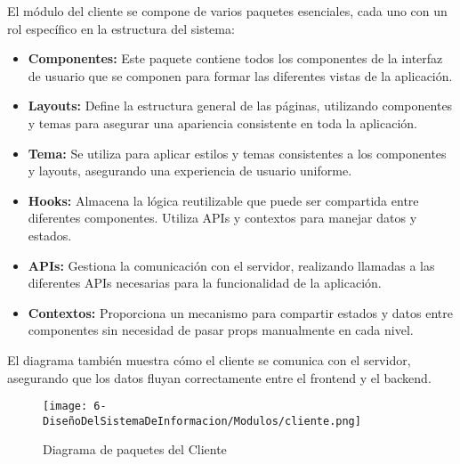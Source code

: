 El módulo del cliente se compone de varios paquetes esenciales, cada uno con un rol específico en la estructura del sistema:
\begin{itemize}
	\item \textbf{Componentes:}  Este paquete contiene todos los componentes de la interfaz de usuario que se componen para formar las diferentes vistas de la aplicación.
	\item \textbf{Layouts:} Define la estructura general de las páginas, utilizando componentes y temas para asegurar una apariencia consistente en toda la aplicación.
	\item \textbf{Tema:} Se utiliza para aplicar estilos y temas consistentes a los componentes y layouts, asegurando una experiencia de usuario uniforme.
	\item \textbf{Hooks:} Almacena la lógica reutilizable que puede ser compartida entre diferentes componentes. Utiliza APIs y contextos para manejar datos y estados.
	\item \textbf{APIs:} Gestiona la comunicación con el servidor, realizando llamadas a las diferentes APIs necesarias para la funcionalidad de la aplicación.
	\item \textbf{Contextos:} Proporciona un mecanismo para compartir estados y datos entre componentes sin necesidad de pasar props manualmente en cada nivel.
\end{itemize}
El diagrama también muestra cómo el cliente se comunica con el servidor, asegurando que los datos fluyan correctamente entre el frontend y el backend.

\begin{figure}[H]
	\centering
	\texttt{[image: 6-DiseñoDelSistemaDeInformacion/Modulos/cliente.png]}
	\caption{Diagrama de paquetes del Cliente}
\end{figure}